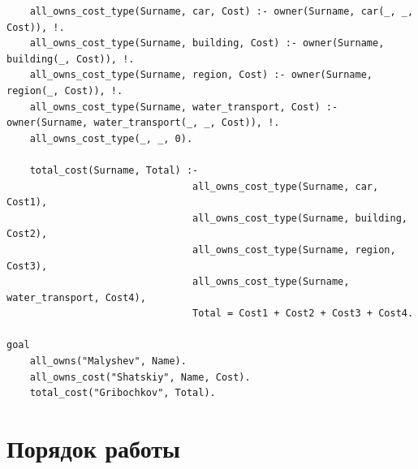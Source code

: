 \documentclass[12pt]{report}
\begin{document}
\begin{lstlisting}
	all_owns_cost_type(Surname, car, Cost) :- owner(Surname, car(_, _, Cost)), !.
	all_owns_cost_type(Surname, building, Cost) :- owner(Surname, building(_, Cost)), !.
	all_owns_cost_type(Surname, region, Cost) :- owner(Surname, region(_, Cost)), !.
	all_owns_cost_type(Surname, water_transport, Cost) :- owner(Surname, water_transport(_, _, Cost)), !.
	all_owns_cost_type(_, _, 0).

	total_cost(Surname, Total) :- 
								all_owns_cost_type(Surname, car, Cost1),
								all_owns_cost_type(Surname, building, Cost2),
								all_owns_cost_type(Surname, region, Cost3),
								all_owns_cost_type(Surname, water_transport, Cost4),
								Total = Cost1 + Cost2 + Cost3 + Cost4.

goal
	all_owns("Malyshev", Name).
	all_owns_cost("Shatskiy", Name, Cost).
	total_cost("Gribochkov", Total).
\end{lstlisting}

\section*{Порядок работы}
\end{document}
